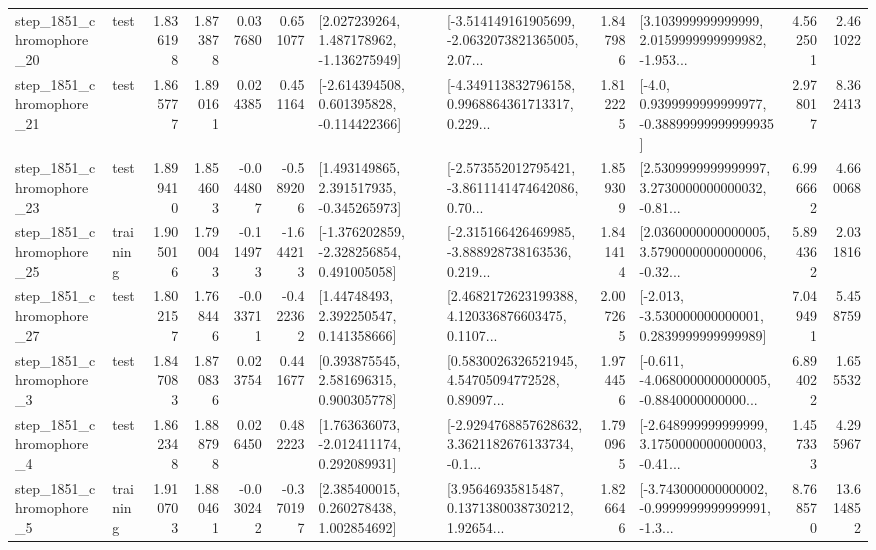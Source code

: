 \begin{tabular}{llrrrrllrlrr}
 step\_1851\_chromophore\_20 &      test &      1.836198 &    1.873878 &      0.037680 &  0.651077 &    [2.027239264, 1.487178962, -1.136275949] &  [-3.514149161905699, -2.0632073821365005, 2.07... &       1.847986 &  [3.103999999999999, 2.0159999999999982, -1.953... &            4.562501 &          2.461022 \\
 step\_1851\_chromophore\_21 &      test &      1.865777 &    1.890161 &      0.024385 &  0.451164 &   [-2.614394508, 0.601395828, -0.114422366] &  [-4.349113832796158, 0.9968864361713317, 0.229... &       1.812225 &   [-4.0, 0.9399999999999977, -0.38899999999999935] &            2.978017 &          8.362413 \\
 step\_1851\_chromophore\_23 &      test &      1.899410 &    1.854603 &     -0.044807 & -0.589206 &    [1.493149865, 2.391517935, -0.345265973] &  [-2.573552012795421, -3.8611141474642086, 0.70... &       1.859309 &  [2.5309999999999997, 3.2730000000000032, -0.81... &            6.996662 &          4.660068 \\
 step\_1851\_chromophore\_25 &  training &      1.905016 &    1.790043 &     -0.114973 & -1.644213 &   [-1.376202859, -2.328256854, 0.491005058] &  [-2.315166426469985, -3.888928738163536, 0.219... &       1.841414 &  [2.0360000000000005, 3.5790000000000006, -0.32... &            5.894362 &          2.031816 \\
 step\_1851\_chromophore\_27 &      test &      1.802157 &    1.768446 &     -0.033711 & -0.422362 &      [1.44748493, 2.392250547, 0.141358666] &  [2.4682172623199388, 4.120336876603475, 0.1107... &       2.007265 &   [-2.013, -3.530000000000001, 0.2839999999999989] &            7.049491 &          5.458759 \\
  step\_1851\_chromophore\_3 &      test &      1.847083 &    1.870836 &      0.023754 &  0.441677 &     [0.393875545, 2.581696315, 0.900305778] &  [0.5830026326521945, 4.54705094772528, 0.89097... &       1.974456 &  [-0.611, -4.0680000000000005, -0.8840000000000... &            6.894022 &          1.655532 \\
  step\_1851\_chromophore\_4 &      test &      1.862348 &    1.888798 &      0.026450 &  0.482223 &    [1.763636073, -2.012411174, 0.292089931] &  [-2.9294768857628632, 3.3621182676133734, -0.1... &       1.790965 &  [-2.648999999999999, 3.1750000000000003, -0.41... &            1.457333 &          4.295967 \\
  step\_1851\_chromophore\_5 &  training &      1.910703 &    1.880461 &     -0.030242 & -0.370197 &     [2.385400015, 0.260278438, 1.002854692] &  [3.95646935815487, 0.1371380038730212, 1.92654... &       1.826646 &  [-3.743000000000002, -0.9999999999999991, -1.3... &            8.768570 &         13.614852 \\

\end{tabular}
